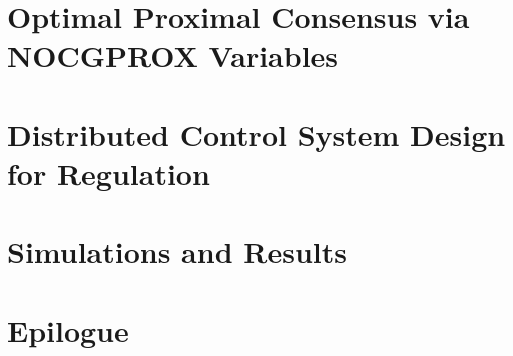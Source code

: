 \documentclass[12pt,twoside]{book}
\numberwithin{equation}{section}
\theoremstyle{definition}
\begin{document}
    \chapter{Optimal Proximal Consensus via NOCGPROX Variables}
    
    
 
    \chapter{Distributed Control System Design for Regulation}
    
    
    \chapter{Simulations and Results}
    
    
 
    
    \chapter{Epilogue}
    
 
    \cleardoublepage
    \nocite{*}
    \printbibliography
\end{document}
